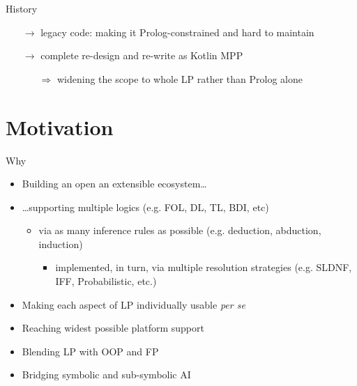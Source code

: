 \documentclass[handout]{beamer}
\begin{document}
\begin{frame}[allowframebreaks]{\tuprolog{} History}
\framebreak

\begin{itemize}
	\item[$\rightarrow$] legacy code: making it Prolog-constrained and hard to maintain
	\item[$\rightarrow$] complete re-design and re-write as Kotlin MPP
	\begin{itemize}
		\item[$\Rightarrow$]  widening the scope to whole LP rather than Prolog alone
	\end{itemize}
\end{itemize}

\end{frame}

\section{Motivation}

\begin{frame}{Why \twopkt{}}
    \begin{itemize}
        \item Building an open an extensible ecosystem\ldots
        \vfill
        \item \ldots supporting \alert{multiple logics} (e.g. FOL, DL, TL, BDI, etc)
        \begin{itemize}
            \item via as many \alert{inference rules} as possible (e.g. deduction, abduction, induction)
            \begin{itemize}
                \item implemented, in turn, via multiple \alert{resolution strategies} (e.g. SLDNF, IFF, Probabilistic, etc.)
            \end{itemize}
        \end{itemize}
        \vfill
        \item Making each aspect of LP individually usable \emph{per se}
        \vfill
        \item Reaching widest possible platform support
        \vfill
        \item Blending LP with OOP and FP
        \vfill
        \item Bridging symbolic and sub-symbolic AI
    \end{itemize}
\end{frame}
\end{document}
